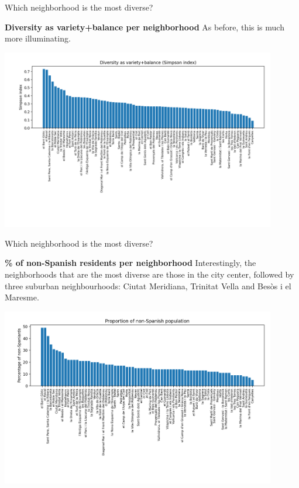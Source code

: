 \documentclass[8pt]{beamer}
\begin{document}
\begin{frame}{Which neighborhood is the most diverse?}

\begin{block}{\textbf{Diversity as variety+balance per neighborhood} }
As before, this is much more illuminating.
\end{block}

\includegraphics[width=12cm, trim= 3cm 4cm 0cm 0cm]{diversity_simpson_barris.png}

\end{frame}

\begin{frame}{Which neighborhood is the most diverse?}

\begin{block}{\textbf{\% of non-Spanish residents per neighborhood}} 
Interestingly, the neighborhoods that are the most diverse are those in the city center, followed by three suburban neighbourhoods: Ciutat Meridiana, Trinitat Vella and Bes\`{o}s i el Maresme.
\end{block}

\includegraphics[width=12cm, trim= 2.8cm 4cm 0cm 0cm]{proportion_non_spanish_neighborhoods.png}


\end{frame}
\end{document}
